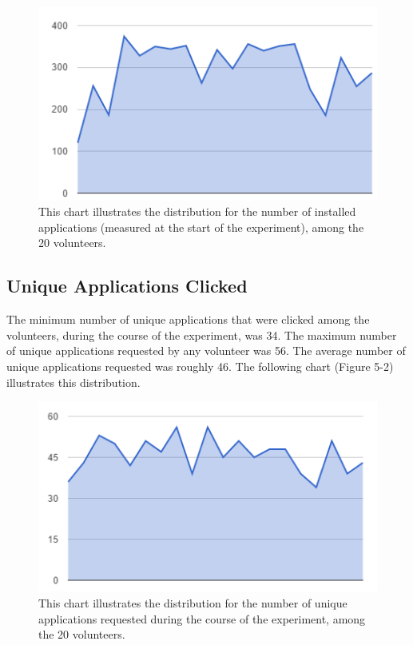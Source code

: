 \documentclass[12pt]{uthesis-v12}  %
\begin{document}
				\begin{figure}[h]
					\centering
					\includegraphics[width = 130mm]{images/totalApps.png}
					\caption[Distribution of Total Installed Applications]{This chart illustrates the distribution for the number of installed applications (measured at the start of the experiment), among the 20 volunteers.}
				\end{figure}
				
			\subsection{Unique Applications Clicked}
				The minimum number of unique applications that were clicked among the volunteers, during the course of the experiment, was 34. The maximum number of unique applications requested by any volunteer was 56. The average number of unique applications requested was roughly 46. The following chart (Figure 5-2) illustrates this distribution.
				
				\begin{figure}[h]
					\centering
					\includegraphics[width = 130mm]{images/uniqueApps.png}
					\caption[Distribution of Unique Applications Requested]{This chart illustrates the distribution for the number of unique applications requested during the course of the experiment, among the 20 volunteers.}
				\end{figure}
				
\end{document}
